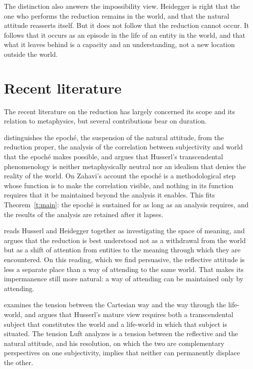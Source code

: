 \documentclass{situationist-preprint}
\begin{document}
The distinction also answers the impossibility view. Heidegger is right that the one who performs the reduction remains in the world, and that the natural attitude reasserts itself. But it does not follow that the reduction cannot occur. It follows that it occurs as an episode in the life of an entity in the world, and that what it leaves behind is a capacity and an understanding, not a new location outside the world.

\section{Recent literature}\label{s:recent}

The recent literature on the reduction has largely concerned its scope and its relation to metaphysics, but several contributions bear on duration.

\citet{Zahavi2017} distinguishes the epoché, the suspension of the natural attitude, from the reduction proper, the analysis of the correlation between subjectivity and world that the epoché makes possible, and argues that Husserl's transcendental phenomenology is neither metaphysically neutral nor an idealism that denies the reality of the world. On Zahavi's account the epoché is a methodological step whose function is to make the correlation visible, and nothing in its function requires that it be maintained beyond the analysis it enables. This fits Theorem~\ref{t:main}: the epoché is sustained for as long as an analysis requires, and the results of the analysis are retained after it lapses.

\citet{Crowell2001} reads Husserl and Heidegger together as investigating the space of meaning, and argues that the reduction is best understood not as a withdrawal from the world but as a shift of attention from entities to the meaning through which they are encountered. On this reading, which we find persuasive, the reflective attitude is less a separate place than a way of attending to the same world. That makes its impermanence still more natural: a way of attending can be maintained only by attending.

\citet{Luft2011} examines the tension between the Cartesian way and the way through the life-world, and argues that Husserl's mature view requires both a transcendental subject that constitutes the world and a life-world in which that subject is situated. The tension Luft analyzes is a tension between the reflective and the natural attitude, and his resolution, on which the two are complementary perspectives on one subjectivity, implies that neither can permanently displace the other.
\end{document}
